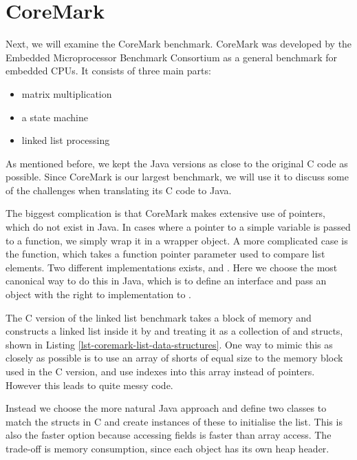 \section{CoreMark}
\label{sec-evaluation-coremark}

Next, we will examine the CoreMark benchmark. CoreMark was developed by the Embedded Microprocessor Benchmark Consortium as a general benchmark for embedded CPUs. It consists of three main parts:
\begin{itemize}
  \item matrix multiplication
  \item a state machine
  \item linked list processing
\end{itemize}

As mentioned before, we kept the Java versions as close to the original C code as possible. Since CoreMark is our largest benchmark, we will use it to discuss some of the challenges when translating its C code to Java.

The biggest complication is that CoreMark makes extensive use of pointers, which do not exist in Java. In cases where a pointer to a simple variable is passed to a function, we simply wrap it in a wrapper object. A more complicated case is the  function, which takes a function pointer parameter  used to compare list elements. Two different implementations exists,  and . Here we choose the most canonical way to do this in Java, which is to define an interface and pass an object with the right to implementation to .

The C version of the linked list benchmark takes a block of memory and constructs a linked list inside it by and treating it as a collection of  and  structs, shown in Listing \ref{lst-coremark-list-data-structures}. One way to mimic this as closely as possible is to use an array of shorts of equal size to the memory block used in the C version, and use indexes into this array instead of pointers. However this leads to quite messy code.

Instead we choose the more natural Java approach and define two classes to match the structs in C and create instances of these to initialise the list. This is also the faster option because accessing fields is faster than array access. The trade-off is memory consumption, since each object has its own heap header.

